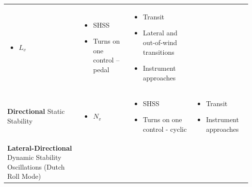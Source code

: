 \documentclass[
]{book}
\providecommand{\tightlist}{%
  \setlength{\itemsep}{0pt}\setlength{\parskip}{0pt}}
\begin{document}
\begin{longtable}[]{@{}llll@{}}
\begin{minipage}[t]{0.14\columnwidth}
\begin{itemize}
\tightlist
\item
  \(L_v\)
\end{itemize}\strut
\end{minipage} & \begin{minipage}[t]{0.27\columnwidth}\raggedright
\begin{itemize}
\tightlist
\item
  SHSS
\item
  Turns on one control -- pedal
\end{itemize}\strut
\end{minipage} & \begin{minipage}[t]{0.33\columnwidth}\raggedright
\begin{itemize}
\tightlist
\item
  Transit
\item
  Lateral and out-of-wind transitions
\item
  Instrument approaches
\end{itemize}\strut
\end{minipage}\tabularnewline
\begin{minipage}[t]{0.16\columnwidth}\raggedright
\textbf{Directional}
Static Stability\strut
\end{minipage} & \begin{minipage}[t]{0.14\columnwidth}\raggedright
\begin{itemize}
\tightlist
\item
  \(N_v\)
\end{itemize}\strut
\end{minipage} & \begin{minipage}[t]{0.27\columnwidth}\raggedright
\begin{itemize}
\tightlist
\item
  SHSS
\item
  Turns on one control - cyclic
\end{itemize}\strut
\end{minipage} & \begin{minipage}[t]{0.33\columnwidth}\raggedright
\begin{itemize}
\tightlist
\item
  Transit
\item
  Instrument approaches
\end{itemize}\strut
\end{minipage}\tabularnewline
\begin{minipage}[t]{0.16\columnwidth}\raggedright
\textbf{Lateral-Directional}
Dynamic Stability
Oscillations
(Dutch Roll Mode)\strut
\end{minipage} & \begin{minipage}[t]{0.14\columnwidth}\raggedright

\end{minipage}
\end{longtable}
\end{document}
